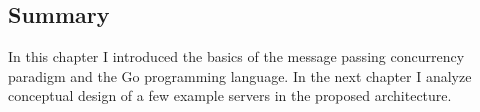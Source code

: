 

\subsection{Summary}
In this chapter I introduced the basics of the message passing concurrency
paradigm and the Go programming language. In the next chapter I 
analyze conceptual design of a few example servers in the proposed
architecture.



